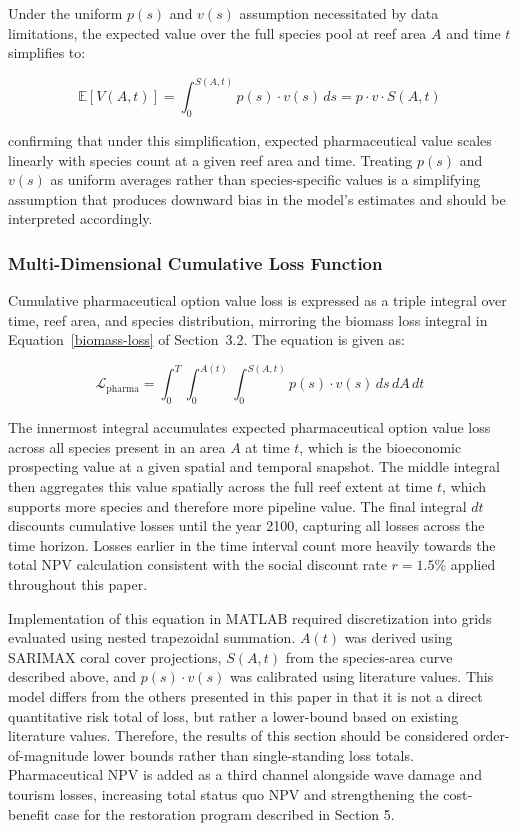 \documentclass[10pt,letterpaper]{article}
\newcounter{assumption}
\newcounter{gs}
\begin{document}
Under the uniform $p(s)$ and $v(s)$ assumption necessitated by data limitations, the expected value over the full species pool at reef area $A$ and time $t$ simplifies to:

\begin{equation}
\mathbb{E}[V(A,t)] = \int_0^{S(A,t)} p(s) \cdot v(s) \, ds = p \cdot v \cdot S(A,t)
\end{equation}

\noindent confirming that under this simplification, expected pharmaceutical value scales linearly with species count at a given reef area and time. Treating $p(s)$ and $v(s)$ as uniform averages rather than species-specific values is a simplifying assumption that produces downward bias in the model's estimates and should be interpreted accordingly.

\subsubsection{Multi-Dimensional Cumulative Loss Function}
Cumulative pharmaceutical option value loss is expressed as a triple integral over time, reef area, and species distribution, mirroring the biomass loss integral in Equation~\ref{biomass-loss} of Section~3.2. The equation is given as:

\smallskip

\begin{equation}
\mathcal{L}_{\text{pharma}} = \int_0^T \int_0^{A(t)} \int_0^{S(A,t)} p(s) \cdot v(s) \, ds \, dA \, dt
\end{equation}

\smallskip

The innermost integral accumulates expected pharmaceutical option value loss across all species present in an area $A$ at time $t$, which is the bioeconomic prospecting value at a given spatial and temporal snapshot. The middle integral then aggregates this value spatially across the full reef extent at time $t$, which supports more species and therefore more pipeline value. The final integral $dt$ discounts cumulative losses until the year 2100, capturing all losses across the time horizon. Losses earlier in the time interval count more heavily towards the total NPV calculation consistent with the social discount rate $r=1.5\%$ applied throughout this paper.

Implementation of this equation in MATLAB required discretization into grids evaluated using nested trapezoidal summation. $A(t)$ was derived using SARIMAX coral cover projections, $S(A,t)$ from the species-area curve described above, and $p(s) \cdot v(s)$ was calibrated using literature values. This model differs from the others presented in this paper in that it is not a direct quantitative risk total of loss, but rather a lower-bound based on existing literature values. Therefore, the results of this section should be considered order-of-magnitude lower bounds rather than single-standing loss totals. Pharmaceutical NPV is added as a third channel alongside wave damage and tourism losses, increasing total status quo NPV and strengthening the cost-benefit case for the restoration program described in Section 5.
\end{document}
